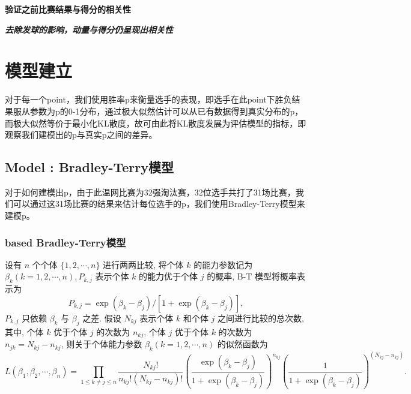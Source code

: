 \documentclass{mcmthesis}
\begin{document}
\textbf{验证之前比赛结果与得分的相关性}
    
\textbf{\textit{去除发球的影响，动量与得分仍呈现出相关性}}



\section{模型建立}

对于每一个point，我们使用胜率p来衡量选手的表现，即选手在此point下胜负结果服从参数为p的0-1分布，通过极大似然估计可以从已有数据得到真实分布的p，而极大似然等价于最小化KL散度，故可由此将KL散度发展为评估模型的指标，即观察我们建模出的p与真实p之间的差异。



\subsection{Model \uppercase\expandafter{}: Bradley-Terry模型}

对于如何建模出p，由于此温网比赛为32强淘汰赛，32位选手共打了31场比赛，我们可以通过这31场比赛的结果来估计每位选手的p，我们使用Bradley-Terry模型来建模p。


\subsubsection{based Bradley-Terry模型}

设有 $n$ 个个体 $\{1,2, \cdots, n\}$ 进行两两比较, 将个体 $k$ 的能力参数记为 $\beta_k(k=1,2, \cdots, n), P_{k, j}$ 表示个体 $k$ 的能力优于个体 $j$ 的概率, B-T 模型将概率表示为
\begin{equation*}
P_{k, j}=\exp \left(\beta_k-\beta_j\right) /\left[1+\exp \left(\beta_k-\beta_j\right)\right],
\end{equation*}
$P_{k, j}$ 只依赖 $\beta_k$ 与 $\beta_j$ 之差.
假设 $N_{k j}$ 表示个体 $k$ 和个体 $j$ 之间进行比较的总次数, 其中, 个体 $k$ 优于个体 $j$ 的次数为 $n_{k j}$, 个体 $j$ 优于个体 $k$ 的次数为 $n_{j k}=N_{k j}-n_{k j}$, 则关于个体能力参数 $\beta_k(k=1,2, \cdots, n)$ 的似然函数为
\begin{equation*}
L\left(\beta_1, \beta_2, \cdots, \beta_n\right)=\prod_{1 \leqslant k \neq j \leqslant n} \frac{N_{k j} !}{n_{k j} !\left(N_{k j}-n_{k j}\right) !}\left(\frac{\exp \left(\beta_k-\beta_j\right)}{1+\exp \left(\beta_k-\beta_j\right)}\right)^{n_{k j}}\left(\frac{1}{1+\exp \left(\beta_k-\beta_j\right)}\right)^{\left(N_{k j}-n_{k j}\right)} .
\end{equation*}
\end{document}
